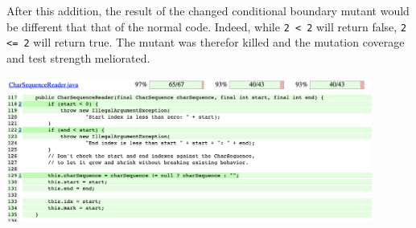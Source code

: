 \noindent After this addition, the result of the changed conditional boundary mutant would be different that that of the normal code. Indeed, while \verb|2 < 2| will return false, \verb|2 <= 2| will return true. The mutant was therefor killed and the mutation coverage and test strength meliorated. 

\begin{center}
        \includegraphics[width=0.9\textwidth]{img/partD-after2.png}
        \includegraphics[width=0.9\textwidth]{img/partD-after3.png}
\end{center}